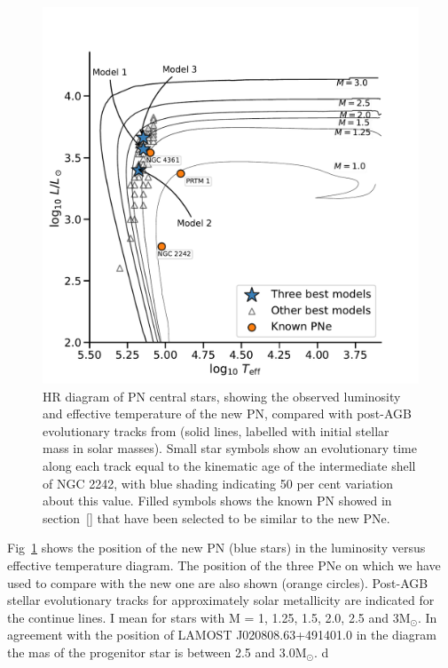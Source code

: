 \documentclass[fleqn,usenatbib]{mnras}
\begin{document}
{\begin{figure}
\centering
  \includegraphics[width=\linewidth]{Figs/hr-planetarieNebula}
  \caption{HR diagram of PN central stars, showing the observed luminosity
and effective temperature of the new PN, compared with
post-AGB evolutionary tracks from \citet{Miller:2016} (solid lines,
labelled with initial stellar mass in solar masses). Small star symbols show
an evolutionary time along each track equal to the kinematic age of the
intermediate shell of NGC 2242, with blue shading indicating 50 per cent
variation about this value.  Filled symbols shows the known PN showed in section~\ref{}
that have been selected to be  similar to the new PNe.} 
 \label{fig:track-evolutive}
\end{figure}

Fig~\ref{fig:track-evolutive} shows the position of the new PN (blue stars) in the luminosity
versus effective temperature diagram. The position of the three PNe on which we have used to
compare with the new one are also shown (orange circles). Post-AGB stellar evolutionary tracks for
approximately solar metallicity \citep{Miller:2016} are indicated for the continue lines.
I mean for stars with M = 1, 1.25, 1.5, 2.0, 2.5 and 3M$_{\odot}$. In agreement with the position of LAMOST J020808.63+491401.0 in the diagram the mas of the progenitor star is between 2.5 and 3.0M$_{\odot}$.
 d
}
\end{document}
